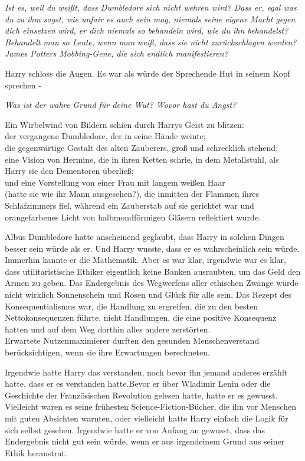 {\emph{Ist es, weil du weißt, dass Dumbledore sich nicht wehren wird? Dass er, egal was du zu ihm sagst, wie unfair es auch sein mag, niemals seine eigene Macht gegen dich einsetzen wird, er dich niemals so behandeln wird, wie du ihn behandelst? Behandelt man so Leute, wenn man weiß, dass sie nicht zurückschlagen werden? James Potters Mobbing-Gene, die sich endlich manifestieren?}

Harry schloss die Augen. Es war als würde der Sprechende Hut in seinem Kopf sprechen -

\emph{Was ist der wahre Grund für deine Wut? Wovor hast du Angst?}

Ein Wirbelwind von Bildern schien durch Harrys Geist zu blitzen:\\ der vergangene Dumbledore, der in seine Hände weinte;\\ die gegenwärtige Gestalt des alten Zauberers, groß und schrecklich stehend;\\ eine Vision von Hermine, die in ihren Ketten schrie, in dem Metallstuhl, als Harry sie den Dementoren überließ;\\ und eine Vorstellung von einer Frau mit langem weißen Haar\\ (hatte sie wie ihr Mann ausgesehen?), die inmitten der Flammen ihres Schlafzimmers fiel, während ein Zauberstab auf sie gerichtet war und orangefarbenes Licht von halbmondförmigen Gläsern reflektiert wurde.

Albus Dumbledore hatte anscheinend geglaubt, dass Harry in solchen Dingen besser sein würde als er. Und Harry wusste, dass er es wahrscheinlich sein würde. Immerhin kannte er die Mathematik. Aber es war klar, irgendwie war es klar, dass utilitaristische Ethiker eigentlich keine Banken ausraubten, um das Geld den Armen zu geben. Das Endergebnis des Wegwerfens aller ethischen Zwänge würde nicht wirklich Sonnenschein und Rosen und Glück für alle sein. Das Rezept des Konsequentialismus war, die Handlung zu ergreifen, die zu den besten Nettokonsequenzen führte, nicht Handlungen, die eine positive Konsequenz hatten und auf dem Weg dorthin alles andere zerstörten.\\ Erwartete Nutzenmaximierer durften den gesunden Menschenverstand berücksichtigen, wenn sie ihre Erwartungen berechneten.

Irgendwie hatte Harry das verstanden, noch bevor ihn jemand anderes erzählt hatte, dass er es verstanden hatte.Bevor er über Wladimir Lenin oder die Geschichte der Französischen Revolution gelesen hatte, hatte er es gewusst. Vielleicht waren es seine frühesten Science-Fiction-Bücher, die ihn vor Menschen mit guten Absichten warnten, oder vielleicht hatte Harry einfach die Logik für sich selbst gesehen. Irgendwie hatte er von Anfang an gewusst, dass das Endergebnis nicht gut sein würde, wenn er aus irgendeinem Grund aus seiner Ethik heraustrat.

}
